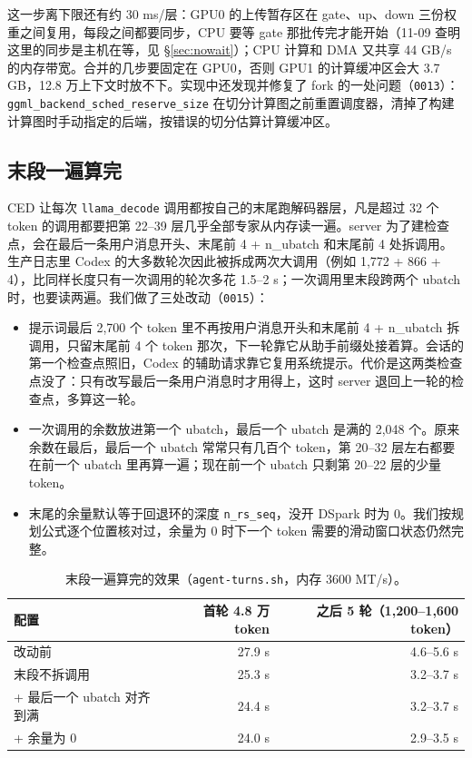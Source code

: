 \documentclass[11pt,a4paper]{article}
\newcommand{\code}[1]{\texttt{#1}}
\begin{document}
这一步离下限还有约 30 ms/层：GPU0 的上传暂存区在 gate、up、down 三份权重之间复用，每段之间都要同步，CPU 要等 gate 那批传完才能开始（11-09 查明这里的同步是主机在等，见 \S\ref{sec:nowait}）；CPU 计算和 DMA 又共享 44 GB/s 的内存带宽。合并的几步要固定在 GPU0，否则 GPU1 的计算缓冲区会大 3.7 GB，12.8 万上下文时放不下。实现中还发现并修复了 fork 的一处问题（\code{0013}）：\code{ggml\_backend\_sched\_reserve\_size} 在切分计算图之前重置调度器，清掉了构建计算图时手动指定的后端，按错误的切分估算计算缓冲区。

\subsection{末段一遍算完}
\label{sec:tailmerge}

CED 让每次 \code{llama\_decode} 调用都按自己的末尾跑解码器层，凡是超过 32 个 token 的调用都要把第 22--39 层几乎全部专家从内存读一遍。server 为了建检查点，会在最后一条用户消息开头、末尾前 4 + n\_ubatch 和末尾前 4 处拆调用。生产日志里 Codex 的大多数轮次因此被拆成两次大调用（例如 1,772 + 866 + 4），比同样长度只有一次调用的轮次多花 1.5--2 s；一次调用里末段跨两个 ubatch 时，也要读两遍。我们做了三处改动（\code{0015}）：

\begin{itemize}
  \item 提示词最后 2,700 个 token 里不再按用户消息开头和末尾前 4 + n\_ubatch 拆调用，只留末尾前 4 个 token 那次，下一轮靠它从助手前缀处接着算。会话的第一个检查点照旧，Codex 的辅助请求靠它复用系统提示。代价是这两类检查点没了：只有改写最后一条用户消息时才用得上，这时 server 退回上一轮的检查点，多算这一轮。
  \item 一次调用的余数放进第一个 ubatch，最后一个 ubatch 是满的 2,048 个。原来余数在最后，最后一个 ubatch 常常只有几百个 token，第 20--32 层左右都要在前一个 ubatch 里再算一遍；现在前一个 ubatch 只剩第 20--22 层的少量 token。
  \item 末尾的余量默认等于回退环的深度 \code{n\_rs\_seq}，没开 DSpark 时为 0。我们按规划公式逐个位置核对过，余量为 0 时下一个 token 需要的滑动窗口状态仍然完整。
\end{itemize}

\begin{table}[h]
  \centering
  \small
  \caption{末段一遍算完的效果（\code{agent-turns.sh}，内存 3600 MT/s）。}
  \label{tab:tailmerge}
  \begin{tabular}{@{}l r r@{}}
    \toprule
    配置 & 首轮 4.8 万 token & 之后 5 轮（1,200--1,600 token） \\
    \midrule
    改动前 & 27.9 s & 4.6--5.6 s \\
    末段不拆调用 & 25.3 s & 3.2--3.7 s \\
    + 最后一个 ubatch 对齐到满 & 24.4 s & 3.2--3.7 s \\
    + 余量为 0 & 24.0 s & 2.9--3.5 s \\
    \bottomrule
  \end{tabular}
\end{table}
\end{document}

